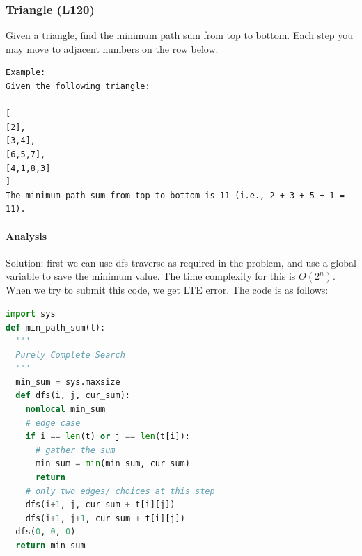 \documentclass[../main.tex]{subfiles}
\begin{document}
  

\subsubsection{Triangle (L120)} 
Given a triangle, find the minimum path sum from top to bottom. Each step you may move to adjacent numbers on the row below.
\begin{lstlisting}[numbers=none]
Example:
Given the following triangle:

[
[2],
[3,4],
[6,5,7],
[4,1,8,3]
]
The minimum path sum from top to bottom is 11 (i.e., 2 + 3 + 5 + 1 = 11).
\end{lstlisting}

  
\paragraph{Analysis}
Solution: first we can use dfs traverse as required in the problem, and use a global variable to save the minimum value. The time complexity for this is $O(2^n)$. When we try to submit this code, we get LTE error. The code is as follows:
\begin{lstlisting}[language = Python]
import sys
def min_path_sum(t):
  '''
  Purely Complete Search
  '''
  min_sum = sys.maxsize
  def dfs(i, j, cur_sum):
    nonlocal min_sum
    # edge case
    if i == len(t) or j == len(t[i]):
      # gather the sum
      min_sum = min(min_sum, cur_sum)
      return
    # only two edges/ choices at this step
    dfs(i+1, j, cur_sum + t[i][j])
    dfs(i+1, j+1, cur_sum + t[i][j])
  dfs(0, 0, 0)
  return min_sum
\end{lstlisting}
\end{document}
